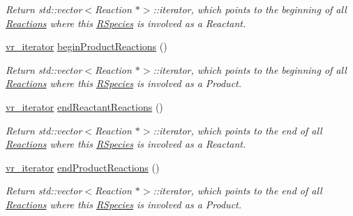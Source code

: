 \begin{DoxyCompactItemize}
\begin{DoxyCompactList}\small\item\em Return std\-::vector$<$\-Reaction $\ast$$>$\-::iterator, which points to the beginning of all \hyperlink{classchem_1_1Reaction}{Reactions} where this \hyperlink{classchem_1_1RSpecies}{R\-Species} is involved as a Reactant. \end{DoxyCompactList}\item 
\hyperlink{namespacechem_a6c6fe26056b061cb8512c46063ad758e}{vr\-\_\-iterator} \hyperlink{classchem_1_1RSpecies_a28a722faa4f1784cf42cb1aeadee9bcb}{begin\-Product\-Reactions} ()
\begin{DoxyCompactList}\small\item\em Return std\-::vector$<$\-Reaction $\ast$$>$\-::iterator, which points to the beginning of all \hyperlink{classchem_1_1Reaction}{Reactions} where this \hyperlink{classchem_1_1RSpecies}{R\-Species} is involved as a Product. \end{DoxyCompactList}\item 
\hyperlink{namespacechem_a6c6fe26056b061cb8512c46063ad758e}{vr\-\_\-iterator} \hyperlink{classchem_1_1RSpecies_a1b228d34e6277a15f672247480f4b51a}{end\-Reactant\-Reactions} ()
\begin{DoxyCompactList}\small\item\em Return std\-::vector$<$\-Reaction $\ast$$>$\-::iterator, which points to the end of all \hyperlink{classchem_1_1Reaction}{Reactions} where this \hyperlink{classchem_1_1RSpecies}{R\-Species} is involved as a Reactant. \end{DoxyCompactList}\item 
\hyperlink{namespacechem_a6c6fe26056b061cb8512c46063ad758e}{vr\-\_\-iterator} \hyperlink{classchem_1_1RSpecies_a1b3db9e6c2246f6d1b4d98d344ff9e9e}{end\-Product\-Reactions} ()
\begin{DoxyCompactList}\small\item\em Return std\-::vector$<$\-Reaction $\ast$$>$\-::iterator, which points to the end of all \hyperlink{classchem_1_1Reaction}{Reactions} where this \hyperlink{classchem_1_1RSpecies}{R\-Species} is involved as a Product. \end{DoxyCompactList}\end{DoxyCompactItemize}
